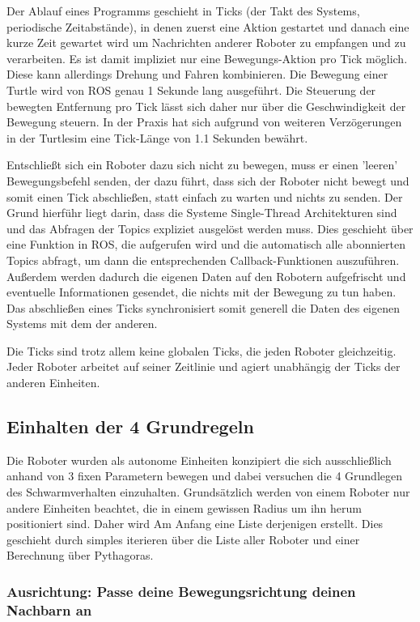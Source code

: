 Der Ablauf eines Programms geschieht in Ticks (der Takt des Systems, periodische Zeitabstände), in denen zuerst eine Aktion gestartet und danach eine kurze Zeit gewartet wird um Nachrichten anderer Roboter zu empfangen und zu verarbeiten. Es ist damit impliziet nur eine Bewegungs-Aktion pro Tick möglich. Diese kann allerdings Drehung und Fahren kombinieren.
Die Bewegung einer Turtle wird von ROS genau 1 Sekunde lang ausgeführt. Die Steuerung der bewegten Entfernung pro Tick lässt sich daher nur über die Geschwindigkeit der Bewegung steuern. In der Praxis hat sich aufgrund von weiteren Verzögerungen in der Turtlesim eine Tick-Länge von 1.1 Sekunden bewährt.

Entschließt sich ein Roboter dazu sich nicht zu bewegen, muss er einen 'leeren' Bewegungsbefehl senden, der dazu führt, dass sich der Roboter nicht bewegt und somit einen Tick abschließen, statt einfach zu warten und nichts zu senden. Der Grund hierführ liegt darin, dass die Systeme Single-Thread Architekturen sind und das Abfragen der Topics expliziet ausgelöst werden muss. Dies geschieht über eine Funktion in ROS, die aufgerufen wird und die automatisch alle abonnierten Topics abfragt, um dann die entsprechenden Callback-Funktionen auszuführen. Außerdem werden dadurch die eigenen Daten auf den Robotern aufgefrischt und eventuelle Informationen gesendet, die nichts mit der Bewegung zu tun haben. Das abschließen eines Ticks synchronisiert somit generell die Daten des eigenen Systems mit dem der anderen.

Die Ticks sind trotz allem keine globalen Ticks, die jeden Roboter gleichzeitig. Jeder Roboter arbeitet auf seiner Zeitlinie und agiert unabhängig der Ticks der anderen Einheiten.

\subsection*{Einhalten der 4 Grundregeln}
Die Roboter wurden als autonome Einheiten konzipiert die sich ausschließlich anhand von 3 fixen Parametern bewegen und dabei versuchen die 4 Grundlegen des Schwarmverhalten einzuhalten. Grundsätzlich werden von einem Roboter nur andere Einheiten beachtet, die in einem gewissen Radius um ihn herum positioniert sind. Daher wird Am Anfang eine Liste derjenigen erstellt. Dies geschieht durch simples iterieren über die Liste aller Roboter und einer Berechnung über Pythagoras.

\subsubsection*{Ausrichtung: Passe deine Bewegungsrichtung deinen Nachbarn an}

